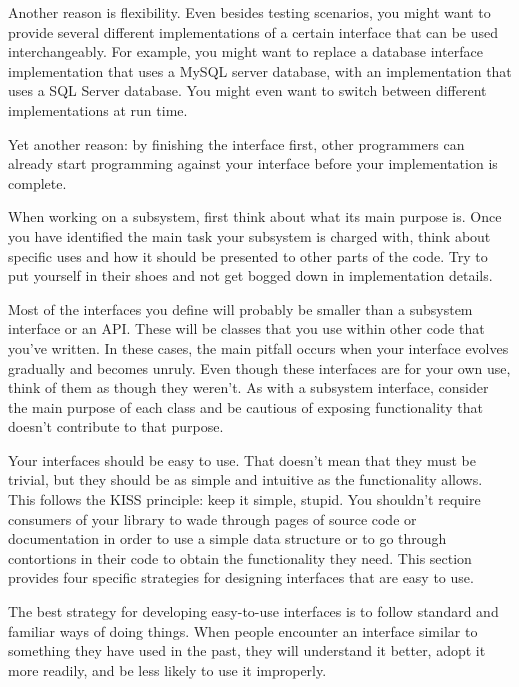 Another reason is flexibility. Even besides testing scenarios, you might want to provide several different implementations of a certain interface that can be used interchangeably. For example, you might want to replace a database interface implementation that uses a MySQL server database, with an implementation that uses a SQL Server database. You might even want to switch between different implementations at run time.

Yet another reason: by finishing the interface first, other programmers can already start programming against your interface before your implementation is complete.

When working on a subsystem, first think about what its main purpose is. Once you have identified the main task your subsystem is charged with, think about specific uses and how it should be presented to other parts of the code. Try to put yourself in their shoes and not get bogged down in implementation details.


Most of the interfaces you define will probably be smaller than a subsystem interface or an API. These will be classes that you use within other code that you’ve written. In these cases, the main pitfall occurs when your interface evolves gradually and becomes unruly. Even though these interfaces are for your own use, think of them as though they weren’t. As with a subsystem interface, consider the main purpose of each class and be cautious of exposing functionality that doesn’t contribute to that purpose.


Your interfaces should be easy to use. That doesn’t mean that they must be trivial, but they should be as simple and intuitive as the functionality allows. This follows the KISS principle: keep it simple, stupid. You shouldn’t require consumers of your library to wade through pages of source code or documentation in order to use a simple data structure or to go through contortions in their code to obtain the functionality they need. This section provides four specific strategies for designing interfaces that are easy to use.


The best strategy for developing easy-to-use interfaces is to follow standard and familiar ways of doing things. When people encounter an interface similar to something they have used in the past, they will understand it better, adopt it more readily, and be less likely to use it improperly.

